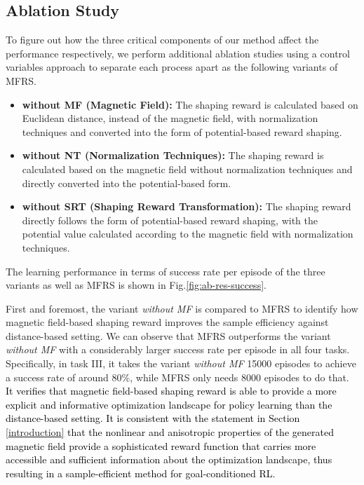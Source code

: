 \documentclass[journal]{IEEEtran}
\begin{document}
\subsection{Ablation Study}\label{ablation}
To figure out how the three critical components of our method affect the performance respectively, we perform additional ablation studies using a control variables approach to separate each process apart as the following variants of MFRS.
\begin{itemize}[leftmargin=1em]
\item \textbf{without MF (Magnetic Field):} The shaping reward is calculated based on Euclidean distance, instead of the magnetic field, with normalization techniques and converted into the form of potential-based reward shaping.
\item \textbf{without NT (Normalization Techniques):} The shaping reward is calculated based on the magnetic field without normalization techniques and directly converted into the potential-based form.
\item \textbf{without SRT (Shaping Reward Transformation):} The shaping reward directly follows the form of potential-based reward shaping, with the potential value calculated according to the magnetic field with normalization techniques.
\end{itemize}
The learning performance in terms of success rate per episode of the three variants as well as MFRS is shown in Fig.\ref{fig:ab-res-success}.


First and foremost, the variant \textit{without MF} is compared to MFRS to identify how magnetic field-based shaping reward improves the sample efficiency against distance-based setting.
We can observe that MFRS outperforms the variant \textit{without MF} with a considerably larger success rate per episode in all four tasks.
Specifically, in task III, it takes the variant \textit{without MF} 15000 episodes to achieve a success rate of around $80\%$, while MFRS only needs 8000 episodes to do that.
\textcolor{black}{It verifies that magnetic field-based shaping reward is able to provide a more explicit and informative optimization landscape for policy learning than the distance-based setting. It is consistent with the statement in Section \ref{introduction} that the nonlinear and anisotropic properties of the generated magnetic field provide a sophisticated reward function that carries more accessible and sufficient information about the optimization landscape, thus resulting in a sample-efficient method for goal-conditioned RL.}
 
\end{document}

